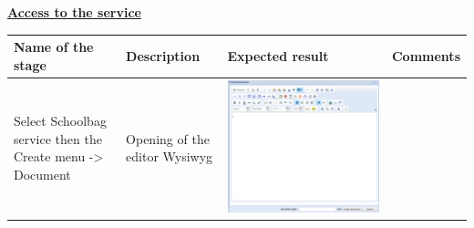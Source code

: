 \newpage
\textbf{\underline {Access to the service}}\\
\newline
\begin{tabular}{|m{3.7cm}|m{2.3cm}|m{4cm}|m{2.1cm}|}
\hline
\textbf{Name of the stage} & \textbf{Description}
 & \textbf{Expected result} & \textbf{Comments} \\
\hline
Select Schoolbag service then the Create menu -> Document & 
Opening of the editor Wysiwyg & 
\begin{minipage}{0.7\textwidth}
\includegraphics[scale=0.15]{Images/wysi.png} 
\end{minipage}& 
\\
\hline
\end{tabular}
\newline

